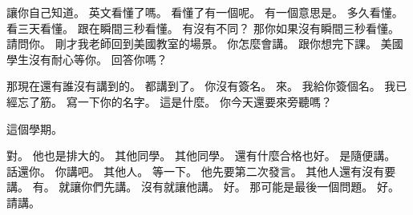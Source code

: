 \hypertarget{w01:cue:3802}{}讓你自己知道。
\hypertarget{w01:cue:3803}{}英文看懂了嗎。
\hypertarget{w01:cue:3804}{}看懂了有一個呢。
\hypertarget{w01:cue:3805}{}有一個意思是。
\hypertarget{w01:cue:3806}{}多久看懂。
\hypertarget{w01:cue:3807}{}看三天看懂。
\hypertarget{w01:cue:3808}{}跟在瞬間三秒看懂。
\hypertarget{w01:cue:3809}{}有沒有不同？
\hypertarget{w01:cue:3810}{}那你如果沒有瞬間三秒看懂。
\hypertarget{w01:cue:3811}{}請問你。
\hypertarget{w01:cue:3812}{}剛才我老師回到美國教室的場景。
\hypertarget{w01:cue:3813}{}你怎麼會講。
\hypertarget{w01:cue:3814}{}跟你想完下課。
\hypertarget{w01:cue:3815}{}美國學生沒有耐心等你。
\hypertarget{w01:cue:3816}{}回答你嗎？

\hypertarget{w01:cue:3817}{}那現在還有誰沒有講到的。
\hypertarget{w01:cue:3818}{}都講到了。
\hypertarget{w01:cue:3819}{}你沒有簽名。
\hypertarget{w01:cue:3820}{}來。
\hypertarget{w01:cue:3821}{}我給你簽個名。
\hypertarget{w01:cue:3822}{}我已經忘了筋。
\hypertarget{w01:cue:3823}{}寫一下你的名字。
\hypertarget{w01:cue:3824}{}這是什麼。
\hypertarget{w01:cue:3825}{}你今天還要來旁聽嗎？

\hypertarget{w01:cue:3826}{}這個學期。

\hypertarget{w01:cue:3827}{}對。
\hypertarget{w01:cue:3828}{}他也是排大的。
\hypertarget{w01:cue:3829}{}其他同學。
\hypertarget{w01:cue:3830}{}其他同學。
\hypertarget{w01:cue:3831}{}還有什麼合格也好。
\hypertarget{w01:cue:3832}{}是隨便講。
\hypertarget{w01:cue:3833}{}話還你。
\hypertarget{w01:cue:3834}{}你講吧。
\hypertarget{w01:cue:3835}{}其他人。
\hypertarget{w01:cue:3836}{}等一下。
\hypertarget{w01:cue:3837}{}他先要第二次發言。
\hypertarget{w01:cue:3838}{}其他人還有沒有要講。
\hypertarget{w01:cue:3839}{}有。
\hypertarget{w01:cue:3840}{}就讓你們先講。
\hypertarget{w01:cue:3841}{}沒有就讓他講。
\hypertarget{w01:cue:3842}{}好。
\hypertarget{w01:cue:3843}{}那可能是最後一個問題。
\hypertarget{w01:cue:3844}{}好。
\hypertarget{w01:cue:3845}{}請講。

